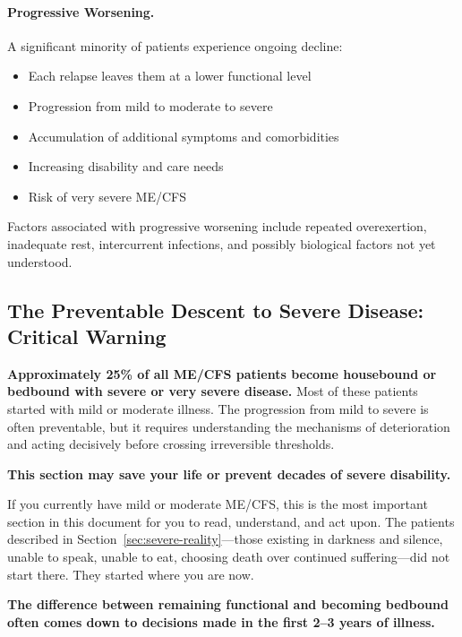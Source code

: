 \paragraph{Progressive Worsening.}
A significant minority of patients experience ongoing decline:
\begin{itemize}
    \item Each relapse leaves them at a lower functional level
    \item Progression from mild to moderate to severe
    \item Accumulation of additional symptoms and comorbidities
    \item Increasing disability and care needs
    \item Risk of very severe ME/CFS
\end{itemize}

Factors associated with progressive worsening include repeated overexertion, inadequate rest, intercurrent infections, and possibly biological factors not yet understood.

\subsection{The Preventable Descent to Severe Disease: Critical Warning}
\label{sec:preventing-severe}

\begin{warning*}
\textbf{Approximately 25\% of all ME/CFS patients become housebound or bedbound with severe or very severe disease.} Most of these patients started with mild or moderate illness. The progression from mild to severe is often preventable, but it requires understanding the mechanisms of deterioration and acting decisively before crossing irreversible thresholds.

\textbf{This section may save your life or prevent decades of severe disability.}

If you currently have mild or moderate ME/CFS, this is the most important section in this document for you to read, understand, and act upon. The patients described in Section~\ref{sec:severe-reality}---those existing in darkness and silence, unable to speak, unable to eat, choosing death over continued suffering---did not start there. They started where you are now.

\textbf{The difference between remaining functional and becoming bedbound often comes down to decisions made in the first 2--3 years of illness.}
\end{warning*}

